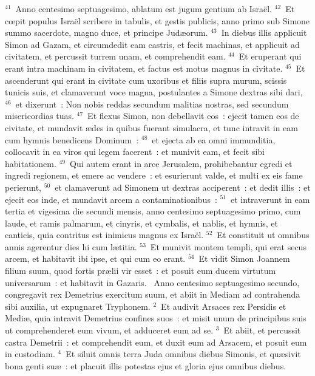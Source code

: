 ${}^{41}$~Anno centesimo septuagesimo, ablatum est jugum gentium ab Isra\"el.
${}^{42}$~Et cœpit populus Isra\"el scribere in tabulis, et gestis publicis, anno primo sub Simone summo sacerdote, magno duce, et principe Jud\ae orum.
${}^{43}$~In diebus illis applicuit Simon ad Gazam, et circumdedit eam castris, et fecit machinas, et applicuit ad civitatem, et percussit turrem unam, et comprehendit eam.
${}^{44}$~Et eruperant qui erant intra machinam in civitatem, et factus est motus magnus in civitate.
${}^{45}$~Et ascenderunt qui erant in civitate cum uxoribus et filiis supra murum, scissis tunicis suis, et clamaverunt voce magna, postulantes a Simone dextras sibi dari,
${}^{46}$~et dixerunt~: Non nobis reddas secundum malitias nostras, sed secundum misericordias tuas.
${}^{47}$~Et flexus Simon, non debellavit eos~: ejecit tamen eos de civitate, et mundavit \ae des in quibus fuerant simulacra, et tunc intravit in eam cum hymnis benedicens Dominum~:
${}^{48}$~et ejecta ab ea omni immunditia, collocavit in ea viros qui legem facerent~: et munivit eam, et fecit sibi habitationem.
${}^{49}$~Qui autem erant in arce Jerusalem, prohibebantur egredi et ingredi regionem, et emere ac vendere~: et esurierunt valde, et multi ex eis fame perierunt,
${}^{50}$~et clamaverunt ad Simonem ut dextras acciperent~: et dedit illis~: et ejecit eos inde, et mundavit arcem a contaminationibus~:
${}^{51}$~et intraverunt in eam tertia et vigesima die secundi mensis, anno centesimo septuagesimo primo, cum laude, et ramis palmarum, et cinyris, et cymbalis, et nablis, et hymnis, et canticis, quia contritus est inimicus magnus ex Isra\"el.
${}^{52}$~Et constituit ut omnibus annis agerentur dies hi cum l\ae titia.
${}^{53}$~Et munivit montem templi, qui erat secus arcem, et habitavit ibi ipse, et qui cum eo erant.
${}^{54}$~Et vidit Simon Joannem filium suum, quod fortis pr\ae lii vir esset~: et posuit eum ducem virtutum universarum~: et habitavit in Gazaris.
~\lettrine[lines=10,image=true,loversize=0.05,lraise=-0.03]{A}{}nno centesimo septuagesimo secundo, congregavit rex Demetrius exercitum suum, et abiit in Mediam ad contrahenda sibi auxilia, ut expugnaret Tryphonem.
${}^{2}$~Et audivit Arsaces rex Persidis et Medi\ae , quia intravit Demetrius confines suos~: et misit unum de principibus suis ut comprehenderet eum vivum, et adduceret eum ad se.
${}^{3}$~Et abiit, et percussit castra Demetrii~: et comprehendit eum, et duxit eum ad Arsacem, et posuit eum in custodiam.
${}^{4}$~Et siluit omnis terra Juda omnibus diebus Simonis, et qu\ae sivit bona genti su\ae~: et placuit illis potestas ejus et gloria ejus omnibus diebus.

